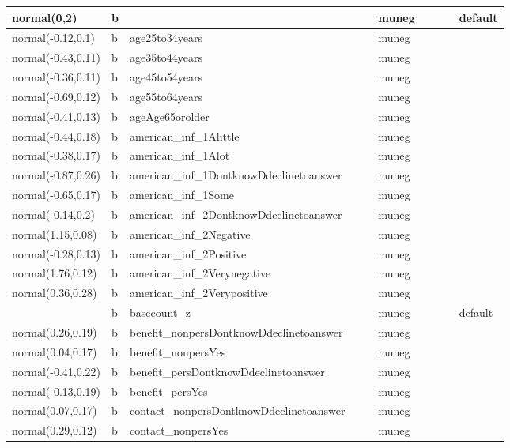 \documentclass[
]{book}
\theoremstyle{definition}
\theoremstyle{definition}
\theoremstyle{definition}
\theoremstyle{definition}
\theoremstyle{remark}
\begin{document}
\begin{table}
\begin{tabular}[t]{l|l|l|l|l|l|l|l|l|l}
\hline
normal(0,2) & b &  &  &  & muneg &  &  &  & default\\
\hline
normal(-0.12,0.1) & b & age25to34years &  &  & muneg &  &  &  & \\
\hline
normal(-0.43,0.11) & b & age35to44years &  &  & muneg &  &  &  & \\
\hline
normal(-0.36,0.11) & b & age45to54years &  &  & muneg &  &  &  & \\
\hline
normal(-0.69,0.12) & b & age55to64years &  &  & muneg &  &  &  & \\
\hline
normal(-0.41,0.13) & b & ageAge65orolder &  &  & muneg &  &  &  & \\
\hline
normal(-0.44,0.18) & b & american\_inf\_1Alittle &  &  & muneg &  &  &  & \\
\hline
normal(-0.38,0.17) & b & american\_inf\_1Alot &  &  & muneg &  &  &  & \\
\hline
normal(-0.87,0.26) & b & american\_inf\_1DontknowDdeclinetoanswer &  &  & muneg &  &  &  & \\
\hline
normal(-0.65,0.17) & b & american\_inf\_1Some &  &  & muneg &  &  &  & \\
\hline
normal(-0.14,0.2) & b & american\_inf\_2DontknowDdeclinetoanswer &  &  & muneg &  &  &  & \\
\hline
normal(1.15,0.08) & b & american\_inf\_2Negative &  &  & muneg &  &  &  & \\
\hline
normal(-0.28,0.13) & b & american\_inf\_2Positive &  &  & muneg &  &  &  & \\
\hline
normal(1.76,0.12) & b & american\_inf\_2Verynegative &  &  & muneg &  &  &  & \\
\hline
normal(0.36,0.28) & b & american\_inf\_2Verypositive &  &  & muneg &  &  &  & \\
\hline
 & b & basecount\_z &  &  & muneg &  &  &  & default\\
\hline
normal(0.26,0.19) & b & benefit\_nonpersDontknowDdeclinetoanswer &  &  & muneg &  &  &  & \\
\hline
normal(0.04,0.17) & b & benefit\_nonpersYes &  &  & muneg &  &  &  & \\
\hline
normal(-0.41,0.22) & b & benefit\_persDontknowDdeclinetoanswer &  &  & muneg &  &  &  & \\
\hline
normal(-0.13,0.19) & b & benefit\_persYes &  &  & muneg &  &  &  & \\
\hline
normal(0.07,0.17) & b & contact\_nonpersDontknowDdeclinetoanswer &  &  & muneg &  &  &  & \\
\hline
normal(0.29,0.12) & b & contact\_nonpersYes &  &  & muneg &  &  &  & \\

\end{tabular}
\end{table}
\end{document}
